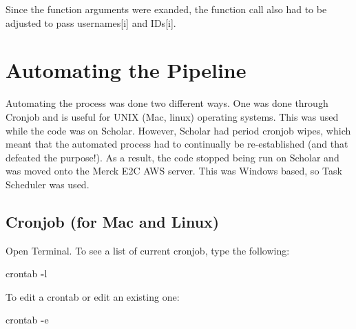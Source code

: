 \documentclass[]{book}
\newenvironment{Shaded}{\begin{snugshade}}{\end{snugshade}}
\newcommand{\KeywordTok}[1]{\textcolor[rgb]{0.13,0.29,0.53}{\textbf{#1}}}
\newcommand{\DecValTok}[1]{\textcolor[rgb]{0.00,0.00,0.81}{#1}}
\newcommand{\SpecialCharTok}[1]{\textcolor[rgb]{0.00,0.00,0.00}{#1}}
\newcommand{\StringTok}[1]{\textcolor[rgb]{0.31,0.60,0.02}{#1}}
\newcommand{\CommentTok}[1]{\textcolor[rgb]{0.56,0.35,0.01}{\textit{#1}}}
\newcommand{\ControlFlowTok}[1]{\textcolor[rgb]{0.13,0.29,0.53}{\textbf{#1}}}
\newcommand{\OperatorTok}[1]{\textcolor[rgb]{0.81,0.36,0.00}{\textbf{#1}}}
\newcommand{\BuiltInTok}[1]{#1}
\newcommand{\NormalTok}[1]{#1}
\begin{document}
Since the function arguments were exanded, the function call also had to
be adjusted to pass usernames{[}i{]} and IDs{[}i{]}.

\begin{Shaded}
\end{Shaded}

\section{Automating the Pipeline}\label{automating-the-pipeline}

Automating the process was done two different ways. One was done through
Cronjob and is useful for UNIX (Mac, linux) operating systems. This was
used while the code was on Scholar. However, Scholar had period cronjob
wipes, which meant that the automated process had to continually be
re-established (and that defeated the purpose!). As a result, the code
stopped being run on Scholar and was moved onto the Merck E2C AWS
server. This was Windows based, so Task Scheduler was used.

\subsection{Cronjob (for Mac and
Linux)}\label{cronjob-for-mac-and-linux}

Open Terminal. To see a list of current cronjob, type the following:

\begin{Shaded}
\begin{Highlighting}[]
\NormalTok{crontab }\OperatorTok{-}\NormalTok{l}
\end{Highlighting}
\end{Shaded}

To edit a crontab or edit an existing one:

\begin{Shaded}
\begin{Highlighting}[]
\NormalTok{crontab }\OperatorTok{-}\NormalTok{e}
\end{Highlighting}
\end{Shaded}
\end{document}
